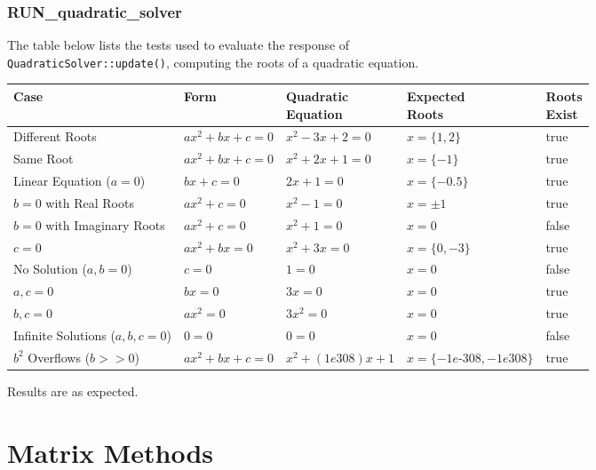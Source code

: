 \documentclass[11pt,fleqn]{report}
\begin{document}
\subsubsection{RUN\_quadratic\_solver}
The table below lists the tests used to evaluate the response of \\
\texttt{QuadraticSolver::update()}, computing the roots of a quadratic
equation.
\begin{center}
\begin{tabular}{|l|l|l||l|l|}
\hline
\textbf{Case} & \textbf{Form} & \makecell{\textbf{Quadratic} \\ \textbf{Equation}} & 
\makecell{\textbf{Expected} \\ \textbf{Roots}} & \makecell{\textbf{Roots} \\ \textbf{Exist}} \\
\hline \hline
Different Roots                & $ax^2+bx+c=0$ & $x^2-3x+2=0$ & $x=\{1,2\}$ & true \\
Same Root                      & $ax^2+bx+c=0$ & $x^2+2x+1=0$ & $x=\{-1\}$ & true \\
Linear Equation ($a=0$)        & $bx+c=0$ & $2x+1=0$ & $x=\{-0.5\}$ & true \\ 
$b=0$ with Real Roots          & $ax^2+c=0$ & $x^2-1=0$ & $x=\pm 1$ & true \\ 
$b=0$ with Imaginary Roots     & $ax^2+c=0$ & $x^2+1=0$ & $x=0$ & false \\ 
$c=0$                          & $ax^2+bx=0$ & $x^2+3x=0$ & $x=\{0,-3\}$ & true \\
No Solution ($a,b=0$)          & $c=0$ & $1=0$ & $x=0$ & false \\
$a,c=0$                        & $bx=0$ & $3x=0$ & $x=0$ & true \\
$b,c=0$                        & $ax^2=0$ & $3x^2=0$ & $x=0$ & true \\
Infinite Solutions ($a,b,c=0$) & $0=0$ & $0=0$ & $x=0$ & false \\
$b^2$ Overflows ($b >> 0$)     & $ax^2+bx+c=0$ & $x^2+(1e308)x+1$ & $x=\{-1e\text{-}308, -1e308\}$ & true \\
\hline \hline
\end{tabular}
\end{center}

Results are as expected.

\section{Matrix Methods}
\end{document}
